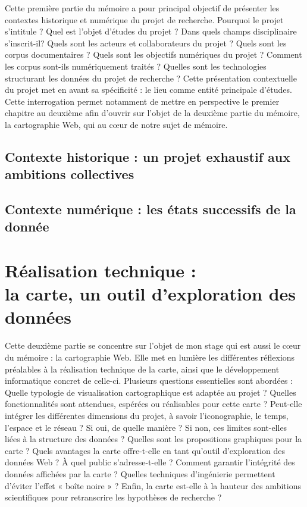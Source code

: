 \documentclass[openany, a4paper, 12pt, twoside]{book}
\renewcommand{\chaptermark}[1]{\markboth{\small\chaptername~\thechapter~--\ \textit{#1}}{}}%
\begin{document}
Cette première partie du mémoire a pour principal objectif de présenter les contextes historique et numérique du projet de recherche. Pourquoi le projet s'intitule ? Quel est l'objet d'études du projet ? Dans quels champs disciplinaire s'inscrit-il? Quels sont les acteurs et collaborateurs du projet ? Quels sont les corpus documentaires ? Quels sont les objectifs numériques du projet ? Comment les corpus sont-ils numériquement traités ?  Quelles sont les technologies structurant les données du projet de recherche ? Cette présentation contextuelle du projet met en avant sa spécificité : le lieu comme entité principale d'études. Cette interrogation permet notamment de mettre en perspective le premier chapitre au deuxième afin d'ouvrir sur l'objet de la deuxième partie du mémoire, la cartographie Web, qui au cœur de notre sujet de mémoire. 

\chapter{Contexte historique : un projet exhaustif aux ambitions collectives}
\chaptermark{Contexte historique}

\chapter{Contexte numérique : les états successifs de la donnée}
\chaptermark{Contexte numérique}


\part[Réalisation technique : la carte, un outil d'exploration des données]{Réalisation technique : \\la carte, un outil d'exploration des données}
Cette deuxième partie se concentre sur l'objet de mon stage qui est aussi le cœur du mémoire : la cartographie Web. Elle met en lumière les différentes réflexions préalables à la réalisation technique de la carte, ainsi que le développement informatique concret de celle-ci. Plusieurs questions essentielles sont abordées : Quelle typologie de visualisation cartographique est adaptée au projet ? Quelles fonctionnalités sont attendues, espérées ou réalisables pour cette carte ? Peut-elle intégrer les différentes dimensions du projet, à savoir l'iconographie, le temps, l'espace et le réseau ? Si oui, de quelle manière ? Si non, ces limites sont-elles liées à la structure des données ? Quelles sont les propositions graphiques pour la carte ? Quels avantages la carte offre-t-elle en tant qu'outil d'exploration des données Web ? À quel public s'adresse-t-elle ? Comment garantir l'intégrité des données affichées par la carte ? Quelles techniques d'ingénierie permettent d'éviter l'effet « boîte noire » ? Enfin, la carte est-elle à la hauteur des ambitions scientifiques pour retranscrire les hypothèses de recherche ?
\end{document}
